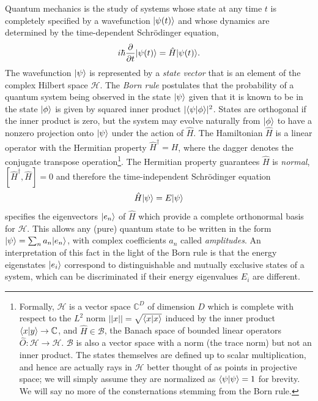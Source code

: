 	Quantum mechanics is the study of systems whose state at any time $t$ is completely specified by a wavefunction $|\psi(t)\rangle$ and whose dynamics are determined by the time-dependent Schr\"{o}dinger equation,
	\begin{equation}
		i\hbar\frac{\partial}{\partial t}|\psi(t)\rangle = \hat{H}|\psi(t)\rangle.
		\label{eqn:TDSE}
	\end{equation}
	The wavefunction $|\psi\rangle$ is represented by a \emph{state vector} that is an element of the complex Hilbert space $\mathcal{H}$.
	The \emph{Born rule} postulates that the probability of a quantum system being observed in the state $|\psi\rangle$ given that it is known to be in the state $|\phi\rangle$ is given by squared inner product $|\langle\psi|\phi\rangle|^2$.
	States are orthogonal if the inner product is zero, but the system may evolve naturally from $|\phi\rangle$ to have a nonzero projection onto $|\psi\rangle$ under the action of $\hat{H}$.
	The Hamiltonian $\hat{H}$ is a linear operator with the Hermitian property $\hat{H}^\dagger=H$, where the dagger denotes the conjugate transpose operation\footnote{Formally, $\mathcal{H}$ is a vector space $\mathbb{C}^D$ of dimension $D$ which is complete with respect to the $L^2$ norm $||x||=\sqrt{\langle x|x\rangle}$ induced by the inner product $\langle x|y\rangle\rightarrow\mathbb{C}$, and $\hat{H}\in\mathcal{B}$, the Banach space of bounded linear operators $\hat{O}:\mathcal{H}\rightarrow\mathcal{H}$.
	$\mathcal{B}$ is also a vector space with a norm (the trace norm) but not an inner product.
	The states themselves are defined up to scalar multiplication, and hence are actually rays in $\mathcal{H}$ better thought of as points in projective space; we will simply assume they are normalized as $\langle\psi|\psi\rangle=1$ for brevity.
	We will say no more of the consternations stemming from the Born rule.}.	
	The Hermitian property guarantees $\hat{H}$ is \emph{normal}, $[\hat{H}^\dagger, \hat{H}]=0$ and therefore the time-independent Schr\"{o}dinger equation
	\begin{equation}
		\hat{H}|\psi\rangle = E|\psi\rangle
		\label{eqn:TISE}
	\end{equation}
	specifies the eigenvectors $|e_n\rangle$ of $\hat{H}$ which provide a complete orthonormal basis for $\mathcal{H}$.
	This allows any (pure) quantum state to be written in the form $|\psi\rangle = \sum_n a_n|e_n\rangle$, with complex coefficients $a_n$ called \emph{amplitudes}.
	An interpretation of this fact in the light of the Born rule is that the energy eigenstates $|e_i\rangle$ correspond to distinguishable  and mutually exclusive  states of a system, which can be discriminated if their energy eigenvalues $E_i$ are different.
	
